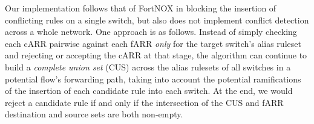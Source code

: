 Our implementation follows that of FortNOX in blocking the insertion of conflicting rules on a single switch, but also does not implement conflict detection across a whole network. One approach is as follows. Instead of simply checking each cARR pairwise against each fARR \emph{only} for the target switch's alias ruleset and rejecting or accepting the cARR at that stage, the algorithm can continue to build a \emph{complete union set} (CUS) across the alias rulesets of all switches in a potential flow's forwarding path, taking into account the potential ramifications of the insertion of each candidate rule into each switch. At the end, we would reject a candidate rule if and only if the intersection of the CUS and fARR destination and source sets are both non-empty. 


